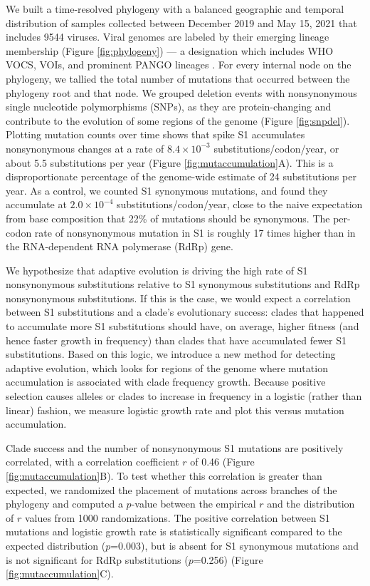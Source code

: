 \documentclass[11pt,oneside,letterpaper]{article}
\begin{document}
We built a time-resolved phylogeny with a balanced geographic and temporal distribution of samples collected between December 2019 and May 15, 2021 that includes 9544 viruses.
Viral genomes are labeled by their emerging lineage membership (Figure \ref{fig:phylogeny}) --- a designation which includes WHO VOCS, VOIs, and prominent PANGO lineages \cite{Rambaut2020-dy}.
For every internal node on the phylogeny, we tallied the total number of mutations that occurred between the phylogeny root and that node.
We grouped deletion events with nonsynonymous single nucleotide polymorphisms (SNPs), as they are protein-changing and contribute to the evolution of some regions of the genome (Figure \ref{fig:snpdel}).
Plotting mutation counts over time shows that spike S1 accumulates nonsynonymous changes at a rate of $8.4 \times 10^{-3}$ substitutions/codon/year, or about 5.5 substitutions per year (Figure \ref{fig:mutaccumulation}A).
This is a disproportionate percentage of the genome-wide estimate of 24 substitutions per year.
As a control, we counted S1 synonymous mutations, and found they accumulate at $2.0 \times 10^{-4}$ substitutions/codon/year, close to the naive expectation from base composition that 22\% of mutations should be synonymous.
The per-codon rate of nonsynonymous mutation in S1 is roughly 17 times higher than in the RNA-dependent RNA polymerase (RdRp) gene.

We hypothesize that adaptive evolution is driving the high rate of S1 nonsynonymous substitutions relative to S1 synonymous substitutions and RdRp nonsynonymous substitutions.
If this is the case, we would expect a correlation between S1 substitutions and a clade's evolutionary success: clades that happened to accumulate more S1 substitutions should have, on average, higher fitness (and hence faster growth in frequency) than clades that have accumulated fewer S1 substitutions.
Based on this logic, we introduce a new method for detecting adaptive evolution, which looks for regions of the genome where mutation accumulation is associated with clade frequency growth.
Because positive selection causes alleles or clades to increase in frequency in a logistic (rather than linear) fashion, we measure logistic growth rate and plot this versus mutation accumulation.

Clade success and the number of nonsynonymous S1 mutations are positively correlated, with a correlation coefficient $r$ of 0.46 (Figure \ref{fig:mutaccumulation}B).
To test whether this correlation is greater than expected, we randomized the placement of mutations across branches of the phylogeny and computed a $p$-value between the empirical $r$ and the distribution of $r$ values from 1000 randomizations.
The positive correlation between S1 mutations and logistic growth rate is statistically significant compared to the expected distribution ($p$=0.003), but is absent for S1 synonymous mutations and is not significant for RdRp substitutions ($p$=0.256) (Figure \ref{fig:mutaccumulation}C).
\end{document}
